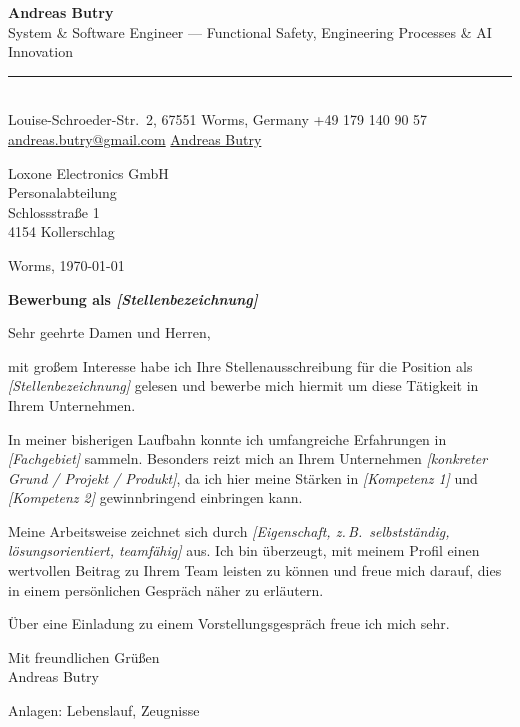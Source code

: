 \documentclass[10pt,a4paper]{article}
\makeatletter
\newcommand{\myname}{Andreas Butry}
\newcommand{\mytitle}{System \& Software Engineer — Functional Safety, Engineering Processes \& AI Innovation}
\newcommand{\myaddress}{Louise-Schroeder-Str.\ 2, 67551 Worms, Germany}
\newcommand{\myphone}{+49 179 140 90 57}
\newcommand{\myemail}{andreas.butry@gmail.com}
\newcommand{\mylinkedin}{Andreas Butry}
\makeatother
\begin{document}
\pagestyle{empty}

{\Huge\bfseries\color{accent}\myname}\\[2pt]
{\color{light}\small\mytitle}\\[6pt]
{\color{accent}\rule{\linewidth}{1.2pt}}\\[4pt]
{\small\color{light}%
  \faMapMarker* \enspace \myaddress \quad\textbar\quad
  \faPhone* \enspace \myphone \\[1pt]
  \faEnvelope \enspace \href{mailto:\myemail}{\myemail} \quad\textbar\quad
  \faLinkedin \enspace \href{https://www.linkedin.com/in/}{\mylinkedin}%
}

\vspace{1.4em}

\begin{minipage}[t]{0.6\linewidth}
  Loxone Electronics GmbH\\
  Personalabteilung\\
  Schlossstraße 1\\
  4154 Kollerschlag
\end{minipage}\hfill
\begin{minipage}[t]{0.35\linewidth}
  \raggedleft Worms, \today
\end{minipage}

\vspace{1.6em}

{\bfseries Bewerbung als \emph{[Stellenbezeichnung]}}

\vspace{0.6em}

Sehr geehrte Damen und Herren,

mit großem Interesse habe ich Ihre Stellenausschreibung für die Position
als \emph{[Stellenbezeichnung]} gelesen und bewerbe mich hiermit um diese
Tätigkeit in Ihrem Unternehmen.

In meiner bisherigen Laufbahn konnte ich umfangreiche Erfahrungen in
\emph{[Fachgebiet]} sammeln. Besonders reizt mich an Ihrem Unternehmen
\emph{[konkreter Grund / Projekt / Produkt]}, da ich hier meine Stärken in
\emph{[Kompetenz 1]} und \emph{[Kompetenz 2]} gewinnbringend einbringen kann.

Meine Arbeitsweise zeichnet sich durch \emph{[Eigenschaft, z.\,B.\
selbstständig, lösungsorientiert, teamfähig]} aus. Ich bin überzeugt, mit
meinem Profil einen wertvollen Beitrag zu Ihrem Team leisten zu können und
freue mich darauf, dies in einem persönlichen Gespräch näher zu erläutern.

Über eine Einladung zu einem Vorstellungsgespräch freue ich mich sehr.

\vspace{1.2em}

Mit freundlichen Grüßen\\[1.6em]
\myname

\vspace{1.4em}
{\small\color{light}Anlagen: Lebenslauf, Zeugnisse}
\end{document}
